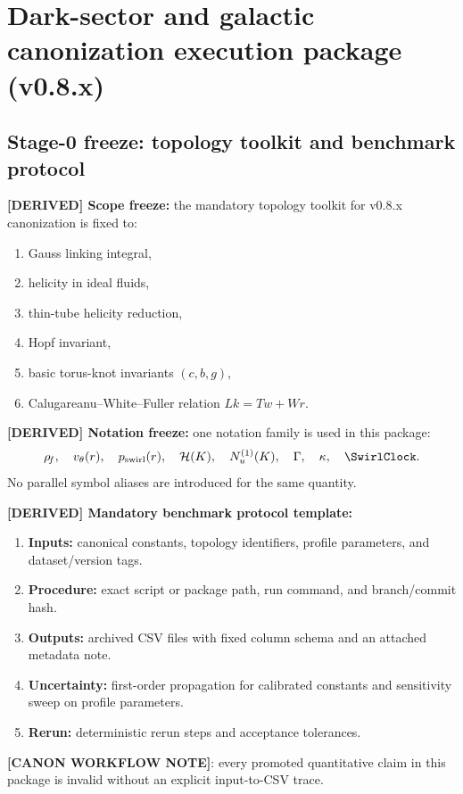 \section{Dark-sector and galactic canonization execution package (v0.8.x)}
\label{sec:dark-sector-execution-package}

\subsection{Stage-0 freeze: topology toolkit and benchmark protocol}
\textbf{[DERIVED] Scope freeze:} the mandatory topology toolkit for v0.8.x canonization is fixed to:
\begin{enumerate}
    \item Gauss linking integral,
    \item helicity in ideal fluids,
    \item thin-tube helicity reduction,
    \item Hopf invariant,
    \item basic torus-knot invariants $(c,b,g)$,
    \item Calugareanu--White--Fuller relation $Lk=Tw+Wr$.
\end{enumerate}

\textbf{[DERIVED] Notation freeze:} one notation family is used in this package:
\[
\rhoF,\quad v_\theta(r),\quad p_{\mathrm{swirl}}(r),\quad
\mathcal{H}(K),\quad N_u^{(1)}(K),\quad \Gamma,\quad \kappa,\quad \SwirlClock.
\]
No parallel symbol aliases are introduced for the same quantity.

\textbf{[DERIVED] Mandatory benchmark protocol template:}
\begin{enumerate}
    \item \textbf{Inputs:} canonical constants, topology identifiers, profile parameters, and dataset/version tags.
    \item \textbf{Procedure:} exact script or package path, run command, and branch/commit hash.
    \item \textbf{Outputs:} archived CSV files with fixed column schema and an attached metadata note.
    \item \textbf{Uncertainty:} first-order propagation for calibrated constants and sensitivity sweep on profile parameters.
    \item \textbf{Rerun:} deterministic rerun steps and acceptance tolerances.
\end{enumerate}

\textbf{[CANON WORKFLOW NOTE]}: every promoted quantitative claim in this package is invalid without an explicit input-to-CSV trace.

